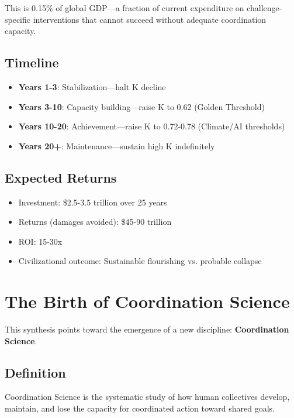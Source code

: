 \documentclass[12pt,letterpaper]{article}
\begin{document}
This is 0.15\% of global GDP---a fraction of current expenditure on challenge-specific interventions that cannot succeed without adequate coordination capacity.

\subsection{Timeline}

\begin{itemize}
    \item \textbf{Years 1-3}: Stabilization---halt K decline
    \item \textbf{Years 3-10}: Capacity building---raise K to 0.62 (Golden Threshold)
    \item \textbf{Years 10-20}: Achievement---raise K to 0.72-0.78 (Climate/AI thresholds)
    \item \textbf{Years 20+}: Maintenance---sustain high K indefinitely
\end{itemize}

\subsection{Expected Returns}

\begin{itemize}
    \item Investment: \$2.5-3.5 trillion over 25 years
    \item Returns (damages avoided): \$45-90 trillion
    \item ROI: 15-30x
    \item Civilizational outcome: Sustainable flourishing vs. probable collapse
\end{itemize}

\section{The Birth of Coordination Science}

This synthesis points toward the emergence of a new discipline: \textbf{Coordination Science}.

\subsection{Definition}

Coordination Science is the systematic study of how human collectives develop, maintain, and lose the capacity for coordinated action toward shared goals.
\end{document}
